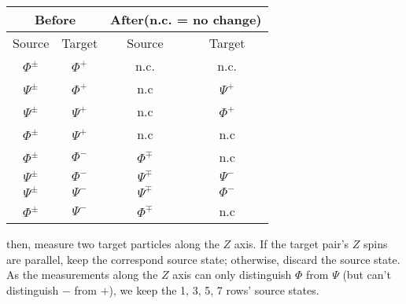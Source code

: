 \documentclass[english,aps,onecolumn]{revtex4-1}
\begin{document}
\begin{enumerate}[1.]
\begin{enumerate}
\begin{table}[!htp]
\begin{tabular}{c c c c}
                   \multicolumn{2}{c}{Before}   &  \multicolumn{2}{c}{After(n.c. = no change)}  \\
                   \hline
                  Source & Target & Source & Target \\
                  \hline
                   $\Phi^{\pm}$ & $\Phi^+$ & n.c. & n.c.  \\
                   $\Psi^{\pm}$ & $\Phi^+$ & n.c & $\Psi^+$ \\
                    $\Psi^{\pm}$ & $\Psi^+$ & n.c & $\Phi^+$ \\
                    $\Phi^{\pm}$ & $\Psi^+$ & n.c & n.c \\
                    $\Phi^{\pm}$ & $\Phi^-$ & $\Phi^{\mp}$ & n.c \\
                    $\Psi^{\pm}$ & $\Phi^-$ & $\Psi^{\mp}$ & $\Psi^-$ \\
                    $\Psi^{\pm}$ & $\Psi^-$ & $\Psi^{\mp}$ & $\Phi^-$ \\
                    $\Phi^{\pm}$ & $\Psi^-$ & $\Phi^{\mp}$ & n.c \\
  \end{tabular}
\end{table}
then, measure two target particles along the $Z$ axis. If the target pair's $Z$ spins are parallel, keep the correspond source state; otherwise, discard the source state. As the measurements along the $Z$ axis can only distinguish $\Phi$ from $\Psi$ (but can't distinguish $-$ from $+$), we keep the 1, 3, 5, 7 rows' source states. %


\end{enumerate}
\end{enumerate}
\end{document}
